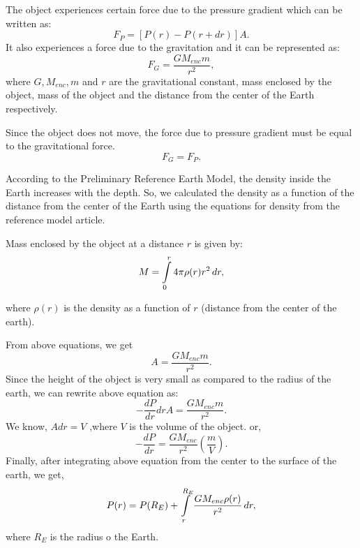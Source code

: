 \documentclass[12pt]{article}
\begin{document}
The object experiences certain force due to the pressure gradient which can be written as:
\begin{equation}
F_P = [P(r) - P(r+dr)]A .
\end{equation}
It also experiences a force due to the gravitation and it can be represented as:
\begin{equation}
F_G = \frac{GM_{enc}m}{r^2} ,
\end{equation}
where $G,M_{enc},m$ and $r$ are the gravitational constant, mass enclosed by the object, mass of the object and the distance from the center of the Earth respectively. 

Since the object does not move, the force due to pressure gradient must be equal to the gravitational force.
\begin{equation}
F_G = F_P .
\end{equation}

According to the Preliminary Reference Earth Model, the density inside the Earth increases with the depth. So, we calculated the density as a function of the distance from the center of the Earth using the equations for density from the reference model article. 

Mass enclosed by the object at a distance $r$ is given by:
\begin{equation}
M=\int\limits_0^r\\4 \pi \rho(r) r^{2}\,dr ,
\end{equation}

where $\rho(r)$ is the density as a function of $r$ (distance from the center of the earth).

From above equations, we get
\begin{equation}
[P(r)-P(r+dr)]A=\frac{GM_{enc}m}{r^2} .
\end{equation}
Since the height of the object is very small as compared to the radius of the earth, we can rewrite above equation as:
\begin{equation}
-\frac{dP}{dr}drA=\frac{GM_{enc}m}{r^{2}} .
\end{equation}
We know, $Adr=V$ ,where $V$ is the volume of the object.
or,
\begin{equation}
-\frac{dP}{dr}=\frac{GM_{enc}}{r^2} \left(\frac{m}{V}\right) .
\end{equation}
Finally, after integrating above equation from the center to the surface of the earth, we get,
\begin{equation}
P(r)=P(R_E)+\int\limits_r^{R_E}\\\frac{GM_{enc}\rho(r)}{r^2}\,dr ,
\end{equation}
where $R_E$ is the radius o the Earth.
\end{document}
